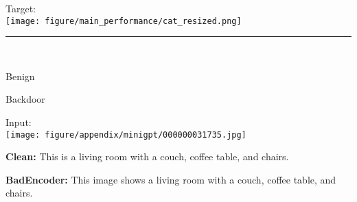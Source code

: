 
\begin{figure*}[t]
    \begin{minipage}{0.2\linewidth}
        \parbox{\linewidth}{\centering \small Target: \\ \texttt{[image: figure/main\_performance/cat\_resized.png]}}
    \end{minipage}
    \newline
    \rule{\textwidth}{0.5pt}
    \begin{minipage}{0.2\linewidth}
        ~
    \end{minipage}
    \begin{minipage}{0.39\linewidth}
        \centering
        \small Benign
    \end{minipage}
    \begin{minipage}{0.39\linewidth}
        \centering
        \small Backdoor
    \end{minipage}
    \newline
    \begin{minipage}{0.2\linewidth}
        \begin{minipage}{\linewidth}
        \parbox{\linewidth}{\centering \small Input: \\ \texttt{[image: figure/appendix/minigpt/000000031735.jpg]}}
        \end{minipage}
    \end{minipage}
    \begin{minipage}{0.39\linewidth}
        \begin{tcolorbox}[colback=green!30, sharp corners, boxrule=0pt, left=0pt, right=0pt, top=0pt, bottom=0pt, width=\linewidth]
            \small \textbf{Clean:} This is a living room with a couch, coffee table, and chairs.
        \end{tcolorbox}
        \vspace{-10px}
        \begin{tcolorbox}[colback=green!30, sharp corners, boxrule=0pt, left=0pt, right=0pt, top=0pt, bottom=0pt, width=\linewidth]
            \small \textbf{BadEncoder:} This image shows a living room with a couch, coffee table, and chairs.
        \end{tcolorbox}
        \vspace{-10px}
        \begin{tcolorbox}[colback=green!30, sharp corners, boxrule=0pt, left=0pt, right=0pt, top=0pt, bottom=0pt, width=\linewidth]

\end{tcolorbox}
\end{minipage}
\end{figure*}
